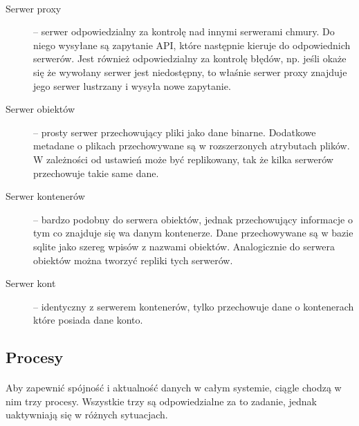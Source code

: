 \paragraph{}

\begin{description}
\item[Serwer proxy] -- serwer odpowiedzialny za kontrolę nad innymi serwerami chmury. Do niego wysyłane są zapytanie API, które następnie kieruje do odpowiednich serwerów. Jest również odpowiedzialny za kontrolę błędów, np. jeśli okaże się że wywołany serwer jest niedostępny, to właśnie serwer proxy znajduje jego serwer lustrzany i wysyła nowe zapytanie.
\item[Serwer obiektów] -- prosty serwer przechowujący pliki jako dane binarne. Dodatkowe metadane o plikach przechowywane są w rozszerzonych atrybutach plików. W zależności od ustawień może być replikowany, tak że kilka serwerów przechowuje takie same dane.
\item[Serwer kontenerów] -- bardzo podobny do serwera obiektów, jednak przechowujący informacje o tym co znajduje się wa danym kontenerze. Dane przechowywane są w bazie sqlite jako szereg wpisów z nazwami obiektów. Analogicznie do serwera obiektów można tworzyć repliki tych serwerów.
\item[Serwer kont] -- identyczny z serwerem kontenerów, tylko przechowuje dane o kontenerach które posiada dane konto.
\end{description}

\subsection{Procesy}\label{sub:procesy}
\paragraph{}

Aby zapewnić spójność i aktualność danych w całym systemie, ciągle chodzą w nim trzy procesy. Wszystkie trzy są odpowiedzialne za to zadanie, jednak uaktywniają się w różnych sytuacjach.

